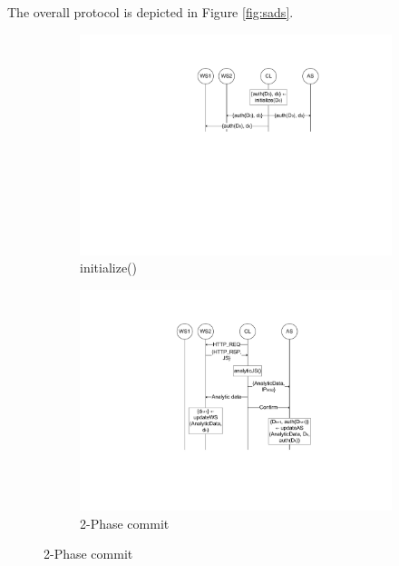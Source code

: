 The overall protocol is depicted in Figure \ref{fig:sads}.

\begin{figure}
        \centering
        \begin{subfigure}[t]{0.49\textwidth}
                \centering
                \includegraphics[width=\textwidth]{figure/sads_1.pdf}
                \caption{initialize()}
                \label{fig:sads_1}
        \end{subfigure}
        \begin{subfigure}[t]{0.49\textwidth}
                \centering
                \includegraphics[width=\textwidth]{figure/sads_2.pdf}
                \caption{2-Phase commit}
                \label{fig:sads_2}
        \end{subfigure}


\end{figure}
